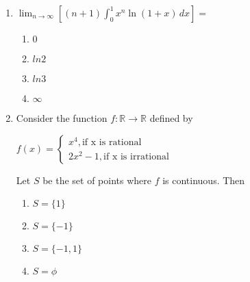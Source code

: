 \documentclass[journal]{IEEEtran}
\theoremstyle{remark}
\begin{document}
\begin{enumerate}
\begin{multicols}{4}
                \end{multicols}

                \item $\lim_{n \to \infty} \left[ (n+1) \int_{0}^{1} x^n \ln(1+x) \, dx \right] =$
                \begin{multicols}{4}
                \begin{enumerate}
                    \item $0$
                    \item $ln 2$
                    \item $ln 3$
                    \item $\infty$
                \end{enumerate}
                    
                \end{multicols}

                \item Consider the function $f: \mathbb{R} \to \mathbb{R}$ defined by
                \begin{center}
			$  f(x)=\begin{cases}
                   x^4,  \text{if  x  is rational} \\
                   2x^2-1,  \text{if x is irrational}
                    \end{cases}$ 
                \end{center}
                Let $S$ be the set of points where $f$ is continuous. Then 
                \begin{multicols}{4}
                \begin{enumerate}
                \item $S=\{1\}$
                    \item $S=\{-1\}$
                    \item $S=\{-1,1\}$
                    \item $S=\phi$
                \end{enumerate}
                    
                \end{multicols}


\end{enumerate}
\end{document}

